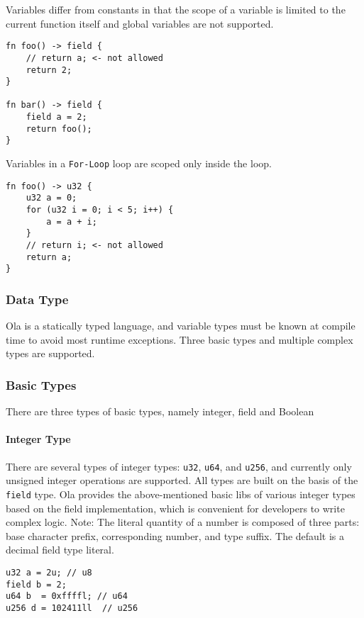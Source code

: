 Variables differ from constants in that the scope of a variable is limited to the current function itself and global variables are not supported.

\begin{lstlisting}
fn foo() -> field {
    // return a; <- not allowed
    return 2;
}

fn bar() -> field {
    field a = 2;
    return foo();
}
\end{lstlisting}

Variables in a \texttt{For-Loop} loop are scoped only inside the loop.

\begin{lstlisting}
fn foo() -> u32 {
    u32 a = 0;
    for (u32 i = 0; i < 5; i++) {
        a = a + i;
    }
    // return i; <- not allowed
    return a;
}
\end{lstlisting}

\subsubsection{Data Type}

Ola is a statically typed language, and variable types must be known at compile time to avoid most runtime exceptions. 
Three basic types and multiple complex types are supported.

\subsubsection*{Basic Types}

There are three types of basic types, namely integer, field and Boolean
\paragraph{Integer Type}

There are several types of integer types: \texttt{u32}, \texttt{u64}, and \texttt{u256}, and currently only unsigned integer operations are supported. 
All types are built on the basis of the \texttt{field} type.
Ola provides the above-mentioned basic libs of various integer types based on the field implementation, which is convenient for developers to write complex logic.
Note: The literal quantity of a number is composed of three parts: base character prefix, corresponding number, and type suffix. The default is a decimal field type literal. 

\begin{lstlisting}
u32 a = 2u; // u8
field b = 2;
u64 b  = 0xffffl; // u64
u256 d = 102411ll  // u256
\end{lstlisting}


